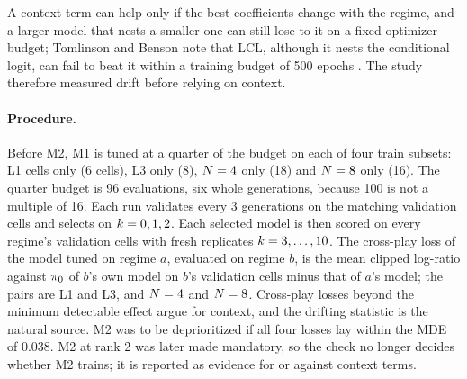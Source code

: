 A context term can help only if the best coefficients change with the regime, and a larger model
that nests a smaller one can still lose to it on a fixed optimizer budget; Tomlinson and Benson
note that LCL, although it nests the conditional logit, can fail to beat it within a training
budget of 500 epochs \citep{tomlinson2021lcl}. The study therefore measured drift before relying
on context.

\paragraph{Procedure.}
Before M2, M1 is tuned at a quarter of the budget on each of four train subsets: L1 cells only
(6 cells), L3 only (8), $N = 4$ only (18) and $N = 8$ only (16). The quarter budget is 96
evaluations, six whole generations, because 100 is not a multiple of 16. Each run validates every
3 generations on the matching validation cells and selects on $k = 0,1,2$. Each selected model
is then scored on every regime's validation cells with fresh replicates $k = 3,\dots,10$. The
cross-play loss of the model tuned on regime $a$, evaluated on regime $b$, is the mean clipped
log-ratio against $\pi_{0}$ of $b$'s own model on $b$'s validation cells minus that of $a$'s model;
the pairs are L1 and L3, and $N = 4$ and $N = 8$. Cross-play losses beyond the minimum
detectable effect argue for context, and the drifting statistic is the natural source. M2 was to
be deprioritized if all four losses lay within the MDE of 0.038. M2 at rank 2 was later made
mandatory, so the check no longer decides whether M2 trains; it is reported as evidence for or
against context terms.

